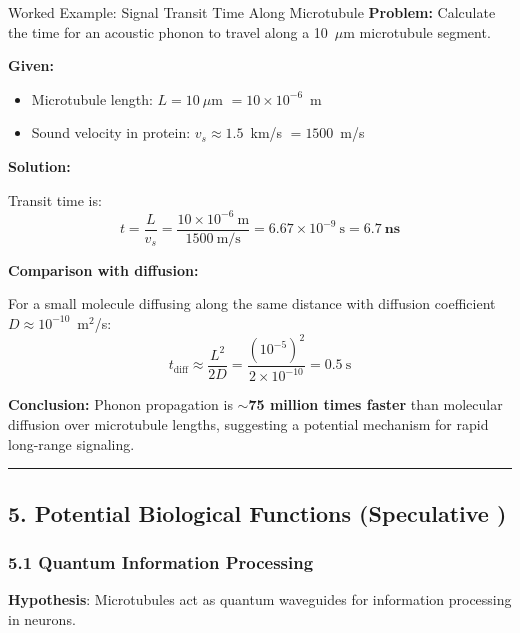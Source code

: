 \begin{calloutbox}{Worked Example: Signal Transit Time Along Microtubule}
\textbf{Problem:} Calculate the time for an acoustic phonon to travel along a 10~$\mu$m microtubule segment.

\textbf{Given:}
\begin{itemize}
\item Microtubule length: $L = 10~\mu$m $= 10 \times 10^{-6}$~m
\item Sound velocity in protein: $v_s \approx 1.5$~km/s $= 1500$~m/s
\end{itemize}

\textbf{Solution:}

Transit time is:
\begin{equation}
t = \frac{L}{v_s} = \frac{10 \times 10^{-6}~\text{m}}{1500~\text{m/s}} = 6.67 \times 10^{-9}~\text{s} = \mathbf{6.7~\text{ns}}
\end{equation}

\textbf{Comparison with diffusion:}

For a small molecule diffusing along the same distance with diffusion coefficient $D \approx 10^{-10}$~m$^2$/s:
\begin{equation}
t_{\text{diff}} \approx \frac{L^2}{2D} = \frac{(10^{-5})^2}{2 \times 10^{-10}} = 0.5~\text{s}
\end{equation}

\textbf{Conclusion:} Phonon propagation is \textbf{$\sim$75 million times faster} than molecular diffusion over microtubule lengths, suggesting a potential mechanism for rapid long-range signaling.
\end{calloutbox}

\begin{center}\rule{0.5\linewidth}{0.5pt}\end{center}

\subsection{5. Potential Biological Functions (Speculative
)}\label{potential-biological-functions-speculative}

\subsubsection{5.1 Quantum Information
Processing}\label{quantum-information-processing}

\textbf{Hypothesis}: Microtubules act as quantum waveguides for
information processing in neurons.

